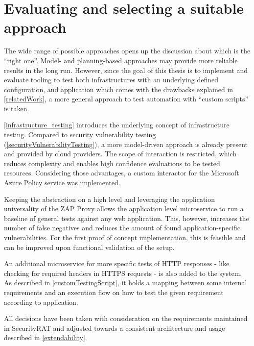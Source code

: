 \section{Evaluating and selecting a suitable approach}
The wide range of possible approaches opens up the discussion about which is the \enquote{right one}. Model- and planning-based approaches may provide more reliable results in the long run. However, since the goal of this thesis is to implement and evaluate tooling to test both infrastructures with an underlying defined configuration, and application which comes with the drawbacks explained in \ref{relatedWork}, a more general approach to test automation with \enquote{custom scripts} is taken.

\ref{infrastructure_testing} introduces the underlying concept of infrastructure testing. Compared to security vulnerability testing (\ref{securityVulnerabilityTesting}), a more model-driven approach is already present and provided by cloud providers. The scope of interaction is restricted, which reduces complexity and enables high confidence evaluations to be tested resources.
Considering those advantages, a custom interactor for the Microsoft Azure Policy service was implemented.

Keeping the abstraction on a high level and leveraging the application universality of the ZAP Proxy allows the application level microservice to run a baseline of general tests against any web application. This, however, increases the number of false negatives and reduces the amount of found application-specific vulnerabilities.
For the first proof of concept implementation, this is feasible and can be improved upon functional validation of the setup.

An additional microservice for more specific tests of HTTP responses - like checking for required headers in HTTPS requests - is also added to the system. As described in \ref{customTestingScript}, it holds a mapping between some internal requirements and an execution flow on how to test the given requirement according to application.

All decisions have been taken with consideration on the requirements maintained in SecurityRAT and adjusted towards a consistent architecture and usage described in \ref{extendability}.